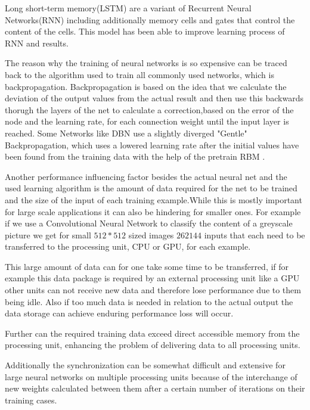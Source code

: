 \documentclass[conference]{IEEEtran}
\begin{document}
Long short-term memory(LSTM)\cite{hochreiter1997long} are a variant of Recurrent Neural Networks(RNN) including additionally memory cells and gates that control the content of the cells. This model has been able to improve learning process of RNN and results.


The reason why the training of neural networks is so expensive can be traced back to the algorithm used to train all commonly used networks, which is backpropagation. Backpropagation is based on the idea that we calculate the deviation of the output values from the actual result and then use this backwards thorugh the layers of the net to calculate a correction,based on the error of the node and the learning rate, for each connection weight until the input layer is reached\cite{riedmiller1993direct}. Some Networks like DBN use a slightly 
diverged "Gentle" Backpropagation, which uses a lowered learning rate after the initial values have been found from the training data with the help of the pretrain RBM \cite{PattersonGibson17}.


Another performance influencing factor besides the actual neural net and the used learning algorithm is the amount of data required for the net to be trained and the size of the input of each training example.While this is mostly important for large scale applications it can also be hindering for smaller ones. For example if we use a Convolutional Neural Network to classify the content of a greyscale picture we get for small $512*512$ sized images $262144$ inputs that each need to be transferred to the processing unit, CPU or GPU, for each example.

This large amount of data can for one take some time to be transferred, if for example this data package is required by an external processing unit like a GPU other units can not  receive new data and therefore lose performance due to them being idle. Also if too much data is needed in relation to the actual output the data storage can achieve enduring performance loss will occur.  

Further can the required training data exceed direct accessible memory from the processing unit, enhancing the problem of delivering data to all processing units.

Additionally the synchronization can be somewhat difficult and extensive for large neural networks on multiple processing units because of the interchange of new weights calculated between them after a certain number of iterations on their training cases.
\end{document}
